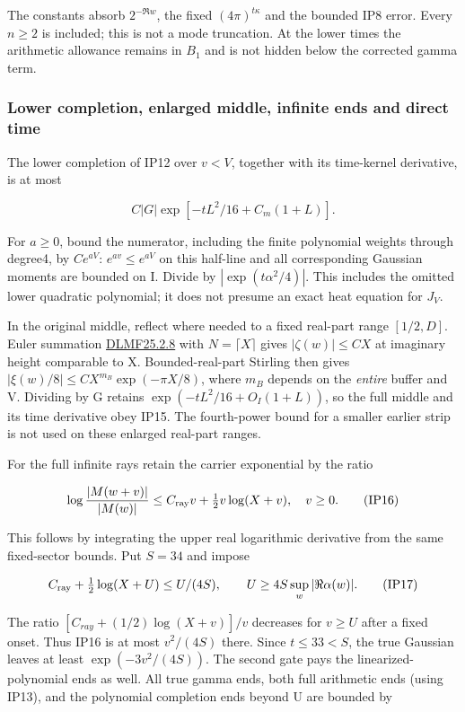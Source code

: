 The constants absorb \(2^{-\Re w}\), the fixed \((4\pi)^{t \kappa}\) and the bounded IP8 error. Every \(n\ge 2\) is included; this is not a mode truncation. At the lower times the arithmetic allowance remains in \(B_{1}\) and is not hidden below the corrected gamma term.

\subsubsection{Lower completion, enlarged middle, infinite ends and direct time}
\label{subsec:ip-4}

The lower completion of IP12 over \(v<V\), together with its time-kernel derivative, is at most

\[
C |G|\exp[-tL^2/16+C_m(1+L)].
\tag{IP15}\label{eq:ansatz-ip15}
\]

For \(a\ge 0\), bound the numerator, including the finite polynomial weights through degree4, by \(C e^{aV}\): \(e^{av}\le e^{aV}\) on this half-line and all corresponding Gaussian moments are bounded on I. Divide by \(|\exp(t \alpha^{2}/4)|\). This includes the omitted lower quadratic polynomial; it does not presume an exact heat equation for \(J_{V}.\)

In the original middle, reflect where needed to a fixed real-part range \([1/2,D]\). Euler summation \href{https://dlmf.nist.gov/25.2.E8}{DLMF25.2.8} with \(N=\lceil X\rceil\) gives \(|\zeta(w)|\le C X\) at imaginary height comparable to X. Bounded-real-part Stirling then gives \(|\xi(w)/8|\le C X^{m_{B}} \exp(-\pi X/8)\), where \(m_{B}\) depends on the \emph{entire} buffer and V. Dividing by G retains \(\exp(-tL^{2}/16+O_{I}(1+L))\), so the full middle and its time derivative obey IP15. The fourth-power bound for a smaller earlier strip is not used on these enlarged real-part ranges.

For the full infinite rays retain the carrier exponential by the ratio

\[
\log\frac{|M(w+v)|}{|M(w)|}
 \le C_{\rm ray}v+\tfrac12v\log(X+v),\quad v\ge0.
\tag{IP16}\label{eq:ansatz-ip16}
\]

This follows by integrating the upper real logarithmic derivative from the same fixed-sector bounds. Put \(S=34\) and impose

\[
C_{\rm ray}+\tfrac12\log(X+U)\le U/(4S),\qquad
U\ge4S\sup_w|\Re\alpha(w)|.
\tag{IP17}\label{eq:ansatz-ip17}
\]

The ratio \([C_{ray}+(1/2)\log(X+v)]/v\) decreases for \(v\ge U\) after a fixed onset. Thus IP16 is at most \(v^{2}/(4S)\) there. Since \(t\le 33<S\), the true Gaussian leaves at least \(\exp(-3v^{2}/(4S))\). The second gate pays the linearized-polynomial ends as well. All true gamma ends, both full arithmetic ends (using IP13), and the polynomial completion ends beyond U are bounded by

